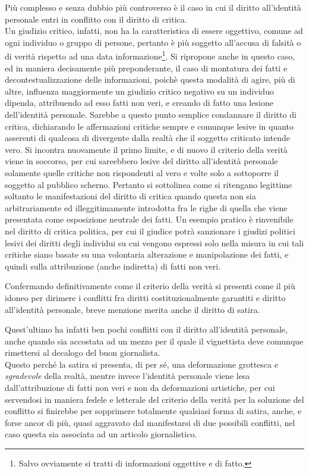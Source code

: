 Più complesso e senza dubbio più controverso è il caso in cui il diritto all'identità personale entri in conflitto con il diritto di critica.
\\Un giudizio critico, infatti, non ha la caratteristica di essere oggettivo, comune ad ogni individuo o gruppo di persone, pertanto è più soggetto all'accusa di falsità o di verità rispetto ad una data informazione\footnote{Salvo ovviamente si tratti di informazioni oggettive e di fatto.}.
Si ripropone anche in questo caso, ed in maniera decisamente più preponderante, il caso di montatura dei fatti e decontestualizzazione delle informazioni, poichè questa modalità di agire, più di altre, influenza maggiormente un giudizio critico negativo su un individuo dipenda, attribuendo ad esso fatti non veri, e creando di fatto una lesione dell'identità personale. 
Sarebbe a questo punto semplice condannare il diritto di critica, dichiarando le affermazioni critiche sempre e comunque lesive in quanto asserenti di qualcosa di divergente dalla realtà che il soggetto criticato intende vero. Si incontra nuovamente il primo limite, e di nuovo il criterio della verità viene in soccorso, per cui sareebbero lesive del diritto all'identità personale solamente quelle critiche non rispondenti al vero e volte solo a sottoporre il soggetto al pubblico scherno. Pertanto si sottolinea come si ritengano legittime soltanto le manifestazioni del diritto di critica quando questa non sia arbitrariamente ed illeggitimamente introdotta fra le righe di quella che viene presentata come esposizione neutrale dei fatti.
Un esempio pratico è rinvenibile nel diritto di critica politica, per cui il giudice potrà sanzionare i giudizi politici lesivi dei diritti degli individui su cui vengono espressi solo nella misura in cui tali critiche siano basate su una volontaria alterazione e manipolazione dei fatti, e quindi sulla attribuzione (anche indiretta) di fatti non veri.


Confermando definitivamente come il criterio della verità si presenti come il più idoneo per dirimere i conflitti fra diritti costituzionalmente garantiti e diritto all'identità personale, breve menzione merita anche il diritto di satira.

Quest'ultimo ha infatti ben pochi conflitti con il diritto all’identità personale, anche quando sia accostata ad un mezzo per il quale il vignettista deve comunque rimettersi al decalogo del buon giornalista.
\\Questo perché la satira si presenta, di per sé, una deformazione grottesca e \textit{sgradevole} della realtà, mentre invece l’identità personale viene lesa dall’attribuzione di fatti non veri e non da deformazioni artistiche, per cui servendosi in maniera fedele e letterale del criterio della verità per la soluzione del conflitto si finirebbe per sopprimere totalmente qualsiasi forma di satira, anche, e forse ancor di più, quasi aggravato dal manifestarsi di due possibili conflitti, nel caso questa sia associata ad un articolo giornalistico.



